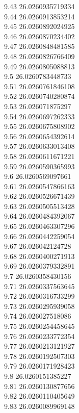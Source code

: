 {9.43	26.0260935719334\\
9.44	26.0260913853214\\
9.45	26.0260892024925\\
9.46	26.0260870234402\\
9.47	26.0260848481585\\
9.48	26.0260826766409\\
9.49	26.0260805088813\\
9.5	26.0260783448733\\
9.51	26.0260761846108\\
9.52	26.0260740280874\\
9.53	26.026071875297\\
9.54	26.0260697262333\\
9.55	26.0260675808902\\
9.56	26.0260654392614\\
9.57	26.0260633013408\\
9.58	26.0260611671221\\
9.59	26.0260590365993\\
9.6	26.0260569097661\\
9.61	26.0260547866163\\
9.62	26.0260526671439\\
9.63	26.0260505513428\\
9.64	26.0260484392067\\
9.65	26.0260463307296\\
9.66	26.0260442259054\\
9.67	26.026042124728\\
9.68	26.0260400271913\\
9.69	26.0260379332891\\
9.7	26.0260358430156\\
9.71	26.0260337563645\\
9.72	26.0260316733299\\
9.73	26.0260295939058\\
9.74	26.026027518086\\
9.75	26.0260254458645\\
9.76	26.0260233772354\\
9.77	26.0260213121927\\
9.78	26.0260192507303\\
9.79	26.0260171928423\\
9.8	26.0260151385227\\
9.81	26.0260130877656\\
9.82	26.0260110405649\\
9.83	26.0260089969148\\
}
